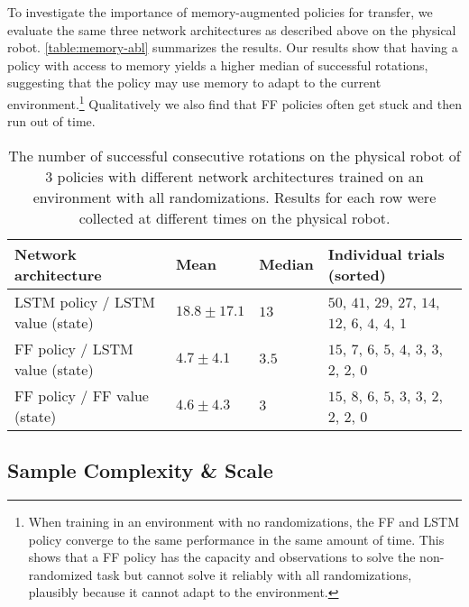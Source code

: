 To investigate the importance of memory-augmented policies for transfer, we evaluate the same three network architectures as described above on the physical robot. \autoref{table:memory-abl} summarizes the results.
Our results show that having a policy with access to memory yields a higher median of successful rotations, suggesting that the policy may use memory to adapt to the current environment.\footnote{When training in an environment with no randomizations, the FF and LSTM policy converge to the same performance in the same amount of time. This shows that a FF policy has the capacity and observations to solve the non-randomized task but cannot solve it reliably with all randomizations, plausibly because it cannot adapt to the environment.}
Qualitatively we also find that FF policies often get stuck and then run out of time.

\begin{table}[h]
    \centering
    \caption{
    The number of successful consecutive rotations on the physical robot of 3 policies with different network architectures trained on an environment with all randomizations.
    Results for each row were collected at different times on the physical robot.
    }
    \renewcommand{\arraystretch}{1.3}
    \begin{tabular}{@{}llll@{}}
        \toprule
        \textbf{Network architecture} & \textbf{Mean} & \textbf{Median} & \textbf{Individual trials (sorted)} \\ 
        \midrule
        LSTM policy / LSTM value (state) & $18.8 \pm 17.1$  & $13$ & $50$, $41$, $29$, $27$, $14$, $12$, $6$, $4$, $4$, $1$ \\
        FF policy / LSTM value (state) & $4.7 \pm 4.1$ & $3.5$ & $15$, $7$, $6$, $5$, $4$, $3$, $3$, $2$, $2$, $0$ \\
        FF policy / FF value (state) & $4.6 \pm 4.3$ & $3$ & $15$, $8$, $6$, $5$, $3$, $3$, $2$, $2$, $2$, $0$ \\
    \bottomrule
    \end{tabular}
    \label{table:memory-abl}
\end{table}

\subsection{Sample Complexity \& Scale}




